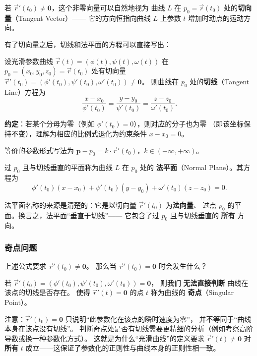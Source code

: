 \documentclass[lang=cn,11pt]{elegantbook}
\begin{document}
若 $\vec{r}'(t_0) \neq \boldsymbol{0}$，这个非零向量可以自然地视为
曲线 $L$ 在 $p_0=\vec{r}(t_0)$ 处的\textbf{切向量}（Tangent Vector）——
它的方向恒指向曲线 $L$ 上参数 $t$ 增加时动点的运动方向。

有了切向量之后，切线和法平面的方程可以直接写出：

\begin{property} \label{property:tangent-line-param}
设光滑参数曲线 $\vec{r}(t)=(\phi(t),\psi(t),\omega(t))$ 在
$p_0=(x_0,y_0,z_0)=\vec{r}(t_0)$ 处有切向量
$\vec{r}'(t_0)=(\phi'(t_0),\psi'(t_0),\omega'(t_0)) \neq \boldsymbol{0}$。
则曲线在 $p_0$ 处的\textbf{切线}（Tangent Line）方程为
\[
\boxed{
\frac{x-x_0}{\phi'(t_0)}
=\frac{y-y_0}{\psi'(t_0)}
=\frac{z-z_0}{\omega'(t_0)}}.
\]

\textbf{约定}：若某个分母为零（例如 $\phi'(t_0)=0$），则对应的分子也为零
（即该坐标保持不变），理解为相应的比例式退化为约束条件 $x-x_0=0$。

等价的参数形式写法为
$\boldsymbol{p}-p_0=k\cdot\vec{r}'(t_0)$，$k\in(-\infty,+\infty)$。
\end{property}

\begin{property}[法平面方程] \label{property:normal-plane}
过 $p_0$ 且与切线垂直的平面称为曲线 $L$ 在 $p_0$ 处的
\textbf{法平面}（Normal Plane）。其方程为
\[
\boxed{
\phi'(t_0)(x-x_0)+\psi'(t_0)(y-y_0)+\omega'(t_0)(z-z_0)=0}.
\]
\end{property}

\begin{note}[公式的几何解释]
法平面名称的来源是清楚的：它是以切向量 $\vec{r}'(t_0)$ 为\textbf{法向量}、
过点 $p_0$ 的平面。换言之，法平面“垂直于切线”——
它包含了过 $p_0$ 且与切线垂直的 \textbf{所有} 方向。
\end{note}

\subsubsection*{奇点问题}

上述公式要求 $\vec{r}'(t_0) \neq \boldsymbol{0}$。
那么当 $\vec{r}'(t_0)=\boldsymbol{0}$ 时会发生什么？

\begin{remark}[奇点]
若 $\vec{r}'(t_0)=(\phi'(t_0),\psi'(t_0),\omega'(t_0))=\boldsymbol{0}$，
则我们 \textbf{无法直接判断} 曲线在该点的切线是否存在。
使得 $\vec{r}'(t)=\boldsymbol{0}$ 的点 $t$ 称为曲线的 \textbf{奇点}（Singular Point）。

注意：$\vec{r}'(t_0)=\boldsymbol{0}$ 只说明“此参数化在该点的瞬时速度为零”，
并不等同于“曲线本身在该点没有切线”。
判断奇点处是否有切线需要更精细的分析（例如考察高阶导数或换一种参数化方式）。
这就是为什么“光滑曲线”的定义要求 $\vec{r}'(t) \neq \boldsymbol{0}$ 
对 \textbf{所有} $t$ 成立——这保证了参数化的正则性与曲线本身的正则性相一致。
\end{remark}
\end{document}
